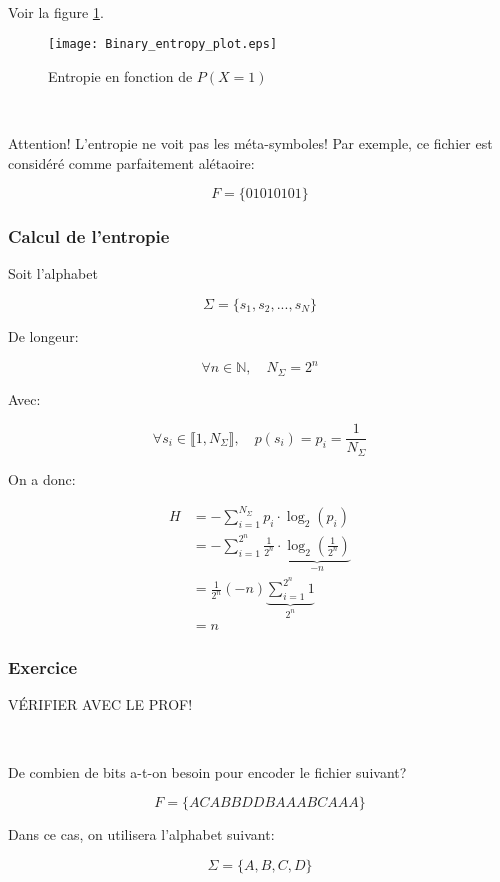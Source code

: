 \documentclass[a4paper,11pt]{article}
\newcommand{\N}{\mathbb{N}}
\newcommand{\ti}{\cdot}
\begin{document}
\

Voir la figure \ref{entropy_prob}.

\begin{figure}[!h]
  \centering
  \texttt{[image: Binary\_entropy\_plot.eps]}
  \caption{Entropie en fonction de $P(X = 1)$}
  \label{entropy_prob}
\end{figure}

\

Attention! L'entropie ne voit pas les méta-symboles! Par exemple, ce fichier
est considéré comme parfaitement alétaoire:

$$ F = \{01010101\} $$

\subsubsection{Calcul de l'entropie}

Soit l'alphabet

$$ \Sigma = \{s_1, s_2, ..., s_N\} $$

De longeur:

$$ \forall n \in \N, \quad N_{\Sigma}= 2^n $$

Avec:

$$ \forall s_i \in \llbracket 1, N_{\Sigma} \rrbracket, \quad p(s_i) = p_i = \frac{1}{N_{\Sigma}} $$

On a donc:

\begin{align*}
  H &= - \sum_{i = 1}^{N_{\Sigma}}p_i \ti \log_2(p_i) \\
    &= - \sum_{i = 1}^{2^n} \frac{1}{2^n} \ti \underbrace{\log_2\left(\frac{1}{2^n} \right)}_{- n} \\
    &= \frac{1}{2^n} (-n) \underbrace{\sum_{i = 1}^{2^n} 1}_{2^n} \\
    &= n
\end{align*}

\subsubsection{Exercice}

VÉRIFIER AVEC LE PROF!

\

De combien de bits a-t-on besoin pour encoder le fichier suivant?

$$ F = \{ACABBDDBAAABCAAA\} $$

Dans ce cas, on utilisera l'alphabet suivant:

$$ \Sigma = \{A, B, C, D \} $$
\end{document}
